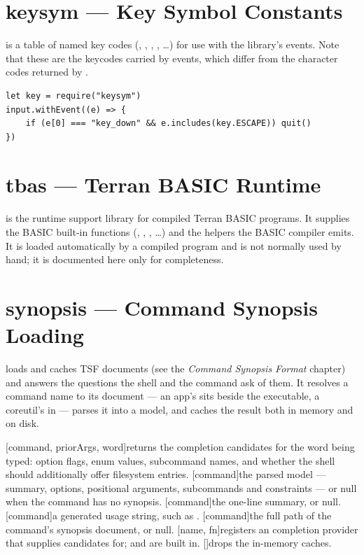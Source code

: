 \section{keysym --- Key Symbol Constants}

 is a table of named key codes (, , , , \dots) for use with the  library's events. Note that these are the keycodes carried by  events, which differ from the character codes returned by .

\begin{lstlisting}
let key = require("keysym")
input.withEvent((e) => {
    if (e[0] === "key_down" && e.includes(key.ESCAPE)) quit()
})
\end{lstlisting}

\section{tbas --- Terran BASIC Runtime}

 is the runtime support library for compiled Terran BASIC programs. It supplies the BASIC built-in functions (, , , \dots) and the helpers the BASIC compiler emits. It is loaded automatically by a compiled program and is not normally used by hand; it is documented here only for completeness.

\section{synopsis --- Command Synopsis Loading}

 loads and caches TSF  documents (see the \emph{Command Synopsis Format} chapter) and answers the questions the shell and the  command ask of them. It resolves a command name to its document --- an app's sits beside the executable, a coreutil's in  --- parses it into a model, and caches the result both in memory and on disk.

\begin{outline}
\1[command, priorArgs, word]{returns the completion candidates for the word being typed: option flags, enum values, subcommand names, and whether the shell should additionally offer filesystem entries.}
\1[command]{the parsed model --- summary, options, positional arguments, subcommands and constraints --- or null when the command has no synopsis.}
\1[command]{the one-line summary, or null.}
\1[command]{a generated usage string, such as .}
\1[command]{the full path of the command's synopsis document, or null.}
\1[name, fn]{registers an  completion provider that  supplies candidates for;  and  are built in.}
\1[]{drops the in-memory caches.}
\end{outline}
